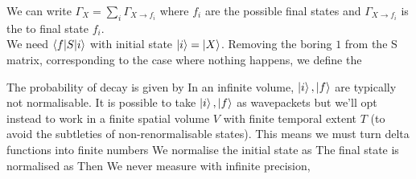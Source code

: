 \documentclass{article}
\begin{document}
We can write $\Gamma_X = \sum_i \Gamma_{X \to f_i}$ where $f_i$ are the possible final states and $\Gamma_{X \to f_i}$ is the  to final state $f_i$. \\

We need $\braket{f | S | i}$ with initial state $\ket{i} = \ket{X}$. Removing the boring $1$ from the S matrix, corresponding to the case where nothing happens, we define the  

The probability of decay is given by 
In an infinite volume, $\ket{i},\ket{f}$ are typically not normalisable. It is possible to take $\ket{i},\ket{f}$ as wavepackets but we'll opt instead to work in a finite spatial volume $V$ with finite temporal extent $T$ (to avoid the subtleties of non-renormalisable states). This means we must turn delta functions into finite numbers 
We normalise the initial state as 
The final state is normalised as 
Then 
We never measure with infinite precision, 
\end{document}

